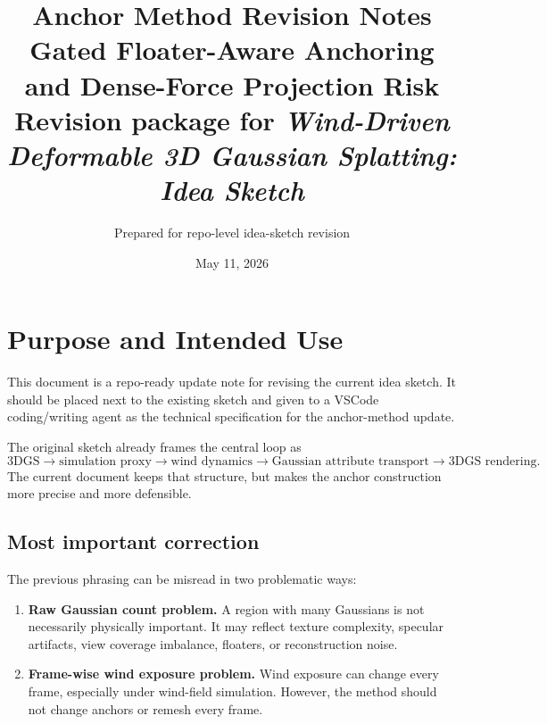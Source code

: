\documentclass[11pt,a4paper]{article}
\title{\textbf{Anchor Method Revision Notes}\\
\large Gated Floater-Aware Anchoring and Dense-Force Projection Risk\\
\normalsize Revision package for \textit{Wind-Driven Deformable 3D Gaussian Splatting: Idea Sketch}}
\author{Prepared for repo-level idea-sketch revision}
\date{May 11, 2026}
\begin{document}
\maketitle

\begin{center}
\end{center}

\section{Purpose and Intended Use}

This document is a repo-ready update note for revising the current idea sketch. It should be placed next to the existing sketch and given to a VSCode coding/writing agent as the technical specification for the anchor-method update.

The original sketch already frames the central loop as
\[
\text{3DGS} \rightarrow \text{simulation proxy} \rightarrow \text{wind dynamics} \rightarrow \text{Gaussian attribute transport} \rightarrow \text{3DGS rendering}.
\]
The current document keeps that structure, but makes the anchor construction more precise and more defensible.

\subsection{Most important correction}

The previous phrasing can be misread in two problematic ways:

\begin{enumerate}[leftmargin=2em]
\item \textbf{Raw Gaussian count problem.} A region with many Gaussians is not necessarily physically important. It may reflect texture complexity, specular artifacts, view coverage imbalance, floaters, or reconstruction noise.
\item \textbf{Frame-wise wind exposure problem.} Wind exposure can change every frame, especially under wind-field simulation. However, the method should not change anchors or remesh every frame.
\end{enumerate}
\end{document}
